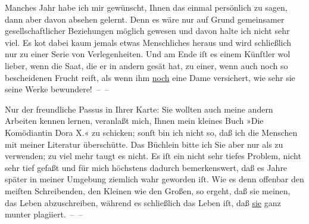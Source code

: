 \pstart
           {\pb}Manches Jahr habe ich mir gewünscht, Ihnen das einmal
               persönlich zu sagen, dann aber davon absehen gelernt. Denn es wäre nur auf Grund
               gemeinsamer gesellschaftlicher Beziehungen möglich gewesen und davon halte ich nicht
               sehr viel. Es ko{\geminationm}t dabei kaum jemals etwas Menschliches
               heraus und wird schließlich nur zu einer Serie von Verlegenheiten. Und am Ende iſt es
               einem Künſtler wol lieber, wenn die Saat, die er in andern gesät hat, zu einer, wenn
               auch noch so bescheidenen Frucht reift, als wenn ihm \uline{noch} eine Dame versichert, wie sehr sie seine Werke bewundere! – –\pend
           
\pstart
           Nur der freundliche Passus in Ihrer Karte: Sie wollten auch meine andern Arbeiten
               kennen lernen, veranlaßt mich, Ihnen mein kleines Buch »Die Komödiantin Dora X.« zu schicken; sonſt bin ich nicht so,
               daß ich die Menschen mit meiner Literatur überschütte. Das Büchlein bitte ich Sie\strikeout{,} aber nur als \label{K_L02572-2v}\label{K_L02572-2} zu verwenden; zu viel mehr taugt es nicht. Es iſt ein nicht sehr tiefes
               Problem, nicht sehr tief gefaßt und für mich höchstens dadurch bemerkenswert, daß es
               Jahre später in meiner Umgebung ziemlich wahr geworden iſt. Wie es denn offenbar den
               meiſten Schreibenden, den Kleinen wie den Großen, so ergeht, {\pb}daß sie meinen, das Leben abzuschreiben, während es schließlich das Leben iſt, daß
                  \uline{sie} ganz munter plagiiert. – –\pend
           
